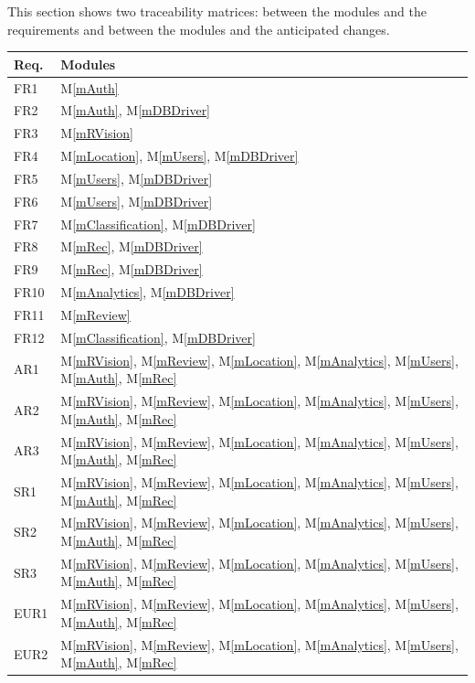 \documentclass[12pt, titlepage]{article}
\newcommand{\mref}[1]{M\ref{#1}}
\begin{document}
This section shows two traceability matrices: between the modules and the
requirements and between the modules and the anticipated changes.

\begin{longtable}{p{} p{}}
\toprule
\textbf{Req.} & \textbf{Modules}\\
\midrule
FR1 & \mref{mAuth}\\
FR2 & \mref{mAuth}, \mref{mDBDriver}\\
FR3 & \mref{mRVision}\\
FR4 & \mref{mLocation}, \mref{mUsers}, \mref{mDBDriver}\\
FR5 & \mref{mUsers}, \mref{mDBDriver}\\
FR6 & \mref{mUsers}, \mref{mDBDriver}\\
FR7 & \mref{mClassification}, \mref{mDBDriver}\\
FR8 & \mref{mRec}, \mref{mDBDriver}\\
FR9 & \mref{mRec}, \mref{mDBDriver}\\
FR10 & \mref{mAnalytics}, \mref{mDBDriver}\\
FR11 & \mref{mReview}\\
FR12 & \mref{mClassification}, \mref{mDBDriver}\\
AR1 & \mref{mRVision}, \mref{mReview}, \mref{mLocation}, \mref{mAnalytics}, \mref{mUsers}, \mref{mAuth}, \mref{mRec}\\
AR2 & \mref{mRVision}, \mref{mReview}, \mref{mLocation}, \mref{mAnalytics}, \mref{mUsers}, \mref{mAuth}, \mref{mRec}\\
AR3 & \mref{mRVision}, \mref{mReview}, \mref{mLocation}, \mref{mAnalytics}, \mref{mUsers}, \mref{mAuth}, \mref{mRec}\\
SR1 & \mref{mRVision}, \mref{mReview}, \mref{mLocation}, \mref{mAnalytics}, \mref{mUsers}, \mref{mAuth}, \mref{mRec}\\
SR2 & \mref{mRVision}, \mref{mReview}, \mref{mLocation}, \mref{mAnalytics}, \mref{mUsers}, \mref{mAuth}, \mref{mRec}\\
SR3 & \mref{mRVision}, \mref{mReview}, \mref{mLocation}, \mref{mAnalytics}, \mref{mUsers}, \mref{mAuth}, \mref{mRec}\\
EUR1 & \mref{mRVision}, \mref{mReview}, \mref{mLocation}, \mref{mAnalytics}, \mref{mUsers}, \mref{mAuth}, \mref{mRec}\\
EUR2 & \mref{mRVision}, \mref{mReview}, \mref{mLocation}, \mref{mAnalytics}, \mref{mUsers}, \mref{mAuth}, \mref{mRec}\\

\end{longtable}
\end{document}
